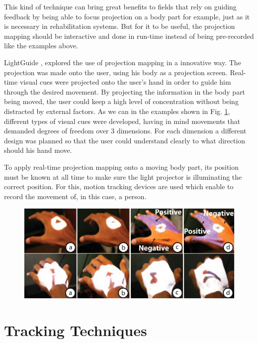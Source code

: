 This kind of technique can bring great benefits to fields that rely on guiding feedback by being able 
to focus projection on a body part for example, just as it is necessary in rehabilitation systems.
But for it to be useful, the projection mapping should be interactive and done in run-time instead of 
being pre-recorded like the examples above.

LightGuide \cite{Sodhi2012}, explored the use of projection mapping in a innovative way. 
The projection was made onto the user, using his body as a projection screen. 
Real-time visual cues were projected onto the user's hand in order to guide him through the desired movement. 
By projecting the information in the body part being moved, the user could keep a high level of concentration 
without being distracted by external factors.
As we can in the examples shown in Fig. \ref{fig:lightguide}, different types of visual cues were developed, having in mind movements that demanded degrees of freedom over 3 dimensions. 
For each dimension a different design was planned so that the user could understand clearly to what direction 
should his hand move.

To apply real-time projection mapping onto a moving body part, its 
position must be known at all time to make sure the light projector is 
illuminating the correct position. 
For this, motion tracking devices are used which enable to record the movement of, in this case, a person. 



\begin{figure}[t!]
\includegraphics[width=\textwidth]{imgs/lightguide}
\centering
\label{fig:lightguide}
\end{figure}

\section{Tracking Techniques} 

